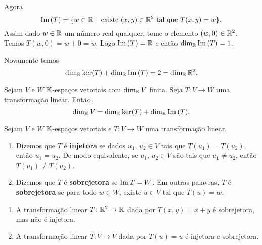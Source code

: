 \begin{exemplos}
\begin{enumerate}[label={\arabic*})]
\begin{solucao}
            Agora
            \[
                {\rm Im\,}(T) = \{w \in \mathbb{R} \mid \mbox{ existe } (x,y) \in \mathbb{R}^2 \mbox{ tal que } T(x,y) = w\}.
            \]
            Assim dado $w \in \mathbb{R}$ um número real qualquer, tome o elemento $(w,0) \in \mathbb{R}^2$. Temos $T(w,0) = w + 0 = w$. Logo ${\rm Im\,}(T) = \mathbb{R}$ e então $\dim_{\mathbb{R}}{\rm Im\,}(T) = 1$.

            Novamente temos
            \[
                \dim_{\mathbb{R}}\ker(T) + \dim_{\mathbb{R}}{\rm Im\,}(T) = 2 = \dim_{\mathbb{R}}\mathbb{R}^2.
            \]
        \end{solucao}
    \end{enumerate}
\end{exemplos}

\begin{teorema}\label{teorema_do_nucleo_e_da_imagem}
    Sejam $V$ e $W$ $\mathbb{K}$-espaços vetoriais com $\dim_{\mathbb{K}}V$ finita. Seja $T : V \to W$ uma transformação linear. Então
    \[
        \dim_{\mathbb{K}}V = \dim_{\mathbb{K}}\ker(T) + \dim_{\mathbb{K}}{\rm Im\,}(T).
    \]
\end{teorema}

\begin{definicao}
    Sejam $V$ e $W$ $\mathbb{K}$-espaços vetoriais e $T \colon V \to W$ uma transformação linear.
    \begin{enumerate}[label={\roman*})]
        \item Dizemos que $T$ é \textbf{injetora} se dados $u_1$, $u_2 \in V$ tais que $T(u_1) = T(u_2)$, então $u_1 = u_2$. De modo equivalente, se $u_1$, $u_2 \in V$ são tais que $u_1 \ne u_2$, então $T(u_1) \ne T(u_2)$.

        \item Dizemos que $T$ é \textbf{sobrejetora} se ${\rm Im\,} T = W$. Em outras palavras, $T$ é \textbf{sobrejetora} se para todo $w \in W$, existe $u \in V$ tal que $T(u) = w$.
    \end{enumerate}
\end{definicao}

\begin{exemplos}
    \begin{enumerate}[label={\arabic*})]
    \item A transformação linear $T \colon \mathbb{R}^2 \to \mathbb{R}$ dada por $T(x,y) = x + y$ é sobrejetora, mas não é injetora.

    \item A transformação linear $T \colon V \to V$ dada por $T(u) = u$ é injetora e sobrejetora.
    \end{enumerate}
\end{exemplos}

